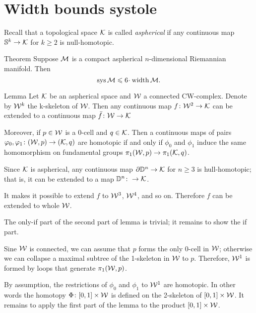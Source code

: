 \section{Width bounds systole}

Recall that a topological space $\mathcal{K}$ is called \emph{aspherical} if any continuous map $\mathbb{S}^k\to \mathcal{K}$ for $k\ge 2$ is null-homotopic.

\begin{thm}{Theorem}\label{thm:sys<width}
Suppose $\mathcal{M}$ is a compact aspherical $n$-dimensional Riemannian manifold.
Then 
\[\sys\spc{M}\le 6 \cdot \width \spc{M}.\]
\end{thm}

\begin{thm}{Lemma}\label{lem:aspherical-homotopy}
Let $\mathcal{K}$ be an aspherical space and $\mathcal{W}$ a connected CW-complex.
Denote by $\mathcal{W}^k$ the k-skeleton of $\mathcal{W}$.
Then any continuous map $f\colon\mathcal{W}^2\to \mathcal{K}$ can be extended to a continuous map $\bar f\colon\mathcal{W}\to \mathcal{K}$

Moreover, if $p\in \mathcal{W}$ is a 0-cell and $q\in \mathcal{K}$.
Then a continuous maps of pairs $\varphi_0,\varphi_1\colon(\mathcal{W},p)\to(\mathcal{K},q)$ are homotopic if and only if $\phi_0$ and $\phi_1$ induce the same homomorphism on fundamental groups $\pi_1(\mathcal{W},p)\to\pi_1(\mathcal{K},q)$.
\end{thm}

Since $\mathcal{K}$ is aspherical, any continuous map $\partial\mathbb{D}^n\to \mathcal{K}$ for $n\ge 3$
is hull-homotopic;
that is, it can be extended to a map $\mathbb{D}^n\colon\to \mathcal{K}$.

It makes it possible to extend $f$ to $\mathcal{W}^3$, $\mathcal{W}^4$, and so on.
Therefore $f$ can be extended to whole $\mathcal{W}$.

The only-if part of the second part of lemma is trivial;
it remains to show the if part.

Sine $\mathcal{W}$ is connected, we can assume that $p$ forms the only 0-cell in $\mathcal{W}$;
otherwise we can collapse a maximal subtree of the 1-skeleton in $\mathcal{W}$ to $p$.
Therefore, $\mathcal{W}^1$ is formed by loops that generate $\pi_1(\mathcal{W},p)$.

By assumption, the restrictions of $\phi_0$ and $\phi_1$ to $\mathcal{W}^1$ are homotopic.
In other words the homotopy $\Phi\colon[0,1]\times \mathcal{W}$ is defined on the 2-skeleton of $[0,1]\times \mathcal{W}$.
It remains to apply the first part of the lemma to the product $[0,1]\times \mathcal{W}$.
\qeds



